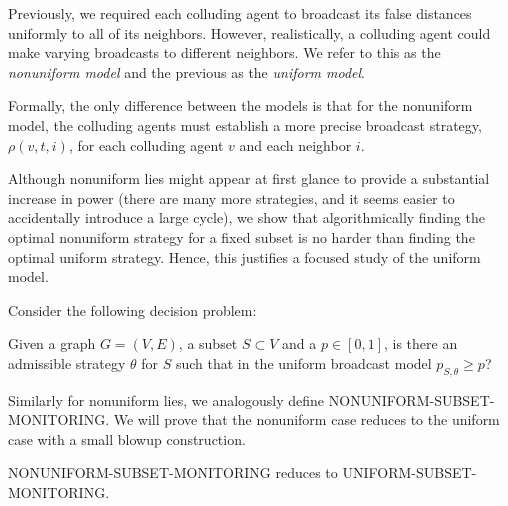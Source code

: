 \documentclass{comnet}
\begin{document}
Previously, we required each colluding agent to broadcast its false distances uniformly to all of its neighbors. However, realistically, a colluding agent could make varying broadcasts to different neighbors. We refer to this as the {\it nonuniform model} and the previous as the {\it uniform model}.

Formally, the only difference between the models is that for the nonuniform model, 
the colluding agents must establish a more precise broadcast strategy, $\rho(v,t,i)$, for each colluding agent $v$ and each neighbor $i$. %

Although nonuniform lies might appear at first glance to provide a substantial increase in power (there are many more strategies, and it seems easier to accidentally introduce a large cycle), we show that algorithmically finding the optimal nonuniform strategy for a fixed subset is
no harder than finding the optimal uniform strategy. Hence, this justifies a focused
study of the uniform model.

Consider the following decision problem:
\begin{problem}
Given a graph $G = (V,E)$, a subset $S \subset V$ and a $p \in [0,1]$, is there
an admissible strategy $\theta$ for $S$ such that in the uniform broadcast
model $p_{S, \theta} \geq p$?
\end{problem} 
 Similarly for nonuniform lies, we analogously define NONUNIFORM-SUBSET-MONITORING. We will prove that the nonuniform case reduces to the uniform case with a small blowup construction.

\begin{proposition} \label{prop:uniform-reduction}

NONUNIFORM-SUBSET-MONITORING reduces to {{UNIFORM-SUBSET-MONITORING}}.

\end{proposition}


\end{document}

